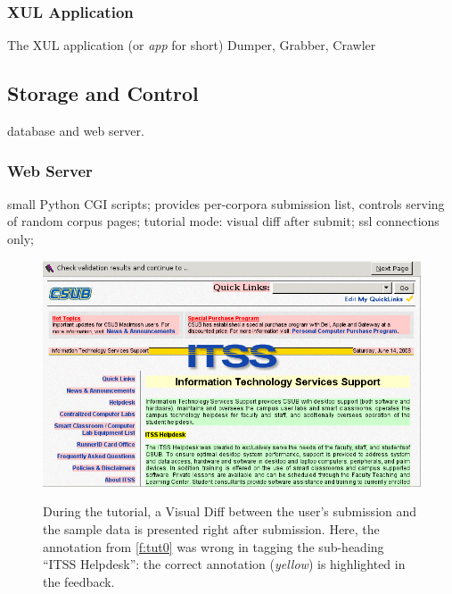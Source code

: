 \subsubsection{XUL Application}

The XUL application (or \textit{app} for short) 
Dumper, Grabber, Crawler


\subsection{Storage and Control}

database and web server. 

\subsubsection{Web Server}

small Python CGI scripts;
provides per-corpora submission list,
controls serving of random corpus pages;
tutorial mode: visual diff after submit;
ssl connections only;

\begin{figure}
	{\includegraphics[width=\textwidth]{tut1}}
\caption{\label{f:tut1}During the tutorial, a Visual Diff between the user's submission and the sample data is presented right after submission.
	Here, the annotation from \ref{f:tut0} was wrong in tagging the sub-heading ``ITSS Helpdesk'': the correct annotation (\textit{yellow}) is highlighted in the feedback.}
\end{figure}

